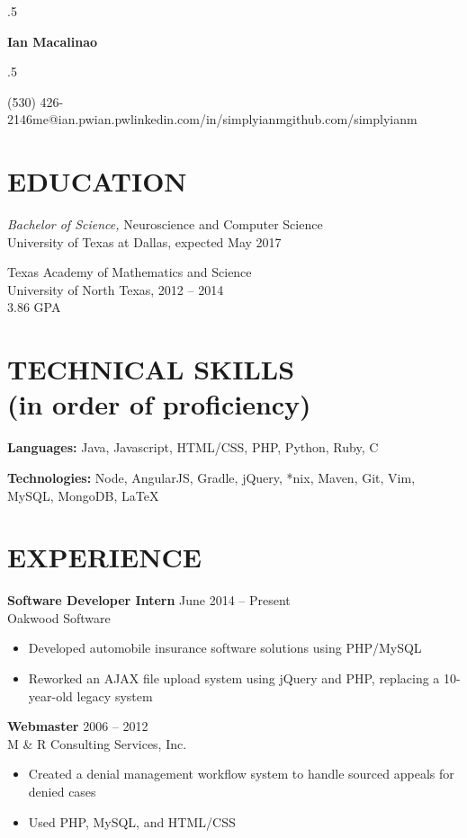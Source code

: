 \documentclass[margin, 10pt]{res} %
\newcommand*{\its}{\hspace{0.8cm}}
\begin{document}
\moveleft.5\hoffset\centerline{\Huge\bf Ian Macalinao}
\bigskip
\moveleft.5\hoffset\centerline{(530) 426-2146\its{}me@ian.pw\its{}ian.pw\its{}linkedin.com/in/simplyianm\its{}github.com/simplyianm}

\begin{resume}

  \section{EDUCATION}

  {\sl Bachelor of Science,} Neuroscience and Computer Science \\
  University of Texas at Dallas, expected May 2017
  \medskip

  Texas Academy of Mathematics and Science \\
  University of North Texas, 2012 -- 2014 \\
  3.86 GPA

  \section{TECHNICAL SKILLS \\ \textnormal{(in order of proficiency)}} 

  {\bf Languages:} Java, Javascript, HTML/CSS, PHP, Python, Ruby, C

  {\bf Technologies:} Node, AngularJS, Gradle, jQuery, *nix, Maven, Git, Vim, MySQL, MongoDB, \LaTeX

  \section{EXPERIENCE}

  {\bf Software Developer Intern} \hfill June 2014 -- Present \\
  Oakwood Software

  \begin{itemize} \itemsep -2pt
    \item Developed automobile insurance software solutions using PHP/MySQL
    \item Reworked an AJAX file upload system using jQuery and PHP, replacing a 10-year-old legacy system
  \end{itemize}

  {\bf Webmaster} \hfill 2006 -- 2012 \\
  M \& R Consulting Services, Inc.
  \begin{itemize} \itemsep -2pt
    \item Created a denial management workflow system to handle sourced appeals for denied cases
    \item Used PHP, MySQL, and HTML/CSS
  \end{itemize} 


\end{resume}
\end{document}
